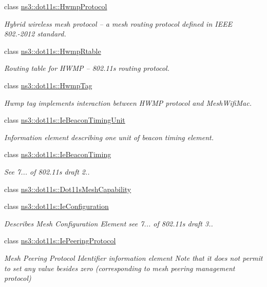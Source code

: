 \begin{DoxyCompactItemize}
class \hyperlink{classns3_1_1dot11s_1_1HwmpProtocol}{ns3\+::dot11s\+::\+Hwmp\+Protocol}
\begin{DoxyCompactList}\small\item\em Hybrid wireless mesh protocol -- a mesh routing protocol defined in I\+E\+EE 802.-\/2012 standard. \end{DoxyCompactList}\item 
class \hyperlink{classns3_1_1dot11s_1_1HwmpRtable}{ns3\+::dot11s\+::\+Hwmp\+Rtable}
\begin{DoxyCompactList}\small\item\em Routing table for H\+W\+MP -- 802.\+11s routing protocol. \end{DoxyCompactList}\item 
class \hyperlink{classns3_1_1dot11s_1_1HwmpTag}{ns3\+::dot11s\+::\+Hwmp\+Tag}
\begin{DoxyCompactList}\small\item\em Hwmp tag implements interaction between H\+W\+MP protocol and Mesh\+Wifi\+Mac. \end{DoxyCompactList}\item 
class \hyperlink{classns3_1_1dot11s_1_1IeBeaconTimingUnit}{ns3\+::dot11s\+::\+Ie\+Beacon\+Timing\+Unit}
\begin{DoxyCompactList}\small\item\em Information element describing one unit of beacon timing element. \end{DoxyCompactList}\item 
class \hyperlink{classns3_1_1dot11s_1_1IeBeaconTiming}{ns3\+::dot11s\+::\+Ie\+Beacon\+Timing}
\begin{DoxyCompactList}\small\item\em See 7... of 802.\+11s draft 2.. \end{DoxyCompactList}\item 
class \hyperlink{classns3_1_1dot11s_1_1Dot11sMeshCapability}{ns3\+::dot11s\+::\+Dot11s\+Mesh\+Capability}
\item 
class \hyperlink{classns3_1_1dot11s_1_1IeConfiguration}{ns3\+::dot11s\+::\+Ie\+Configuration}
\begin{DoxyCompactList}\small\item\em Describes Mesh Configuration Element see 7... of 802.\+11s draft 3.. \end{DoxyCompactList}\item 
class \hyperlink{classns3_1_1dot11s_1_1IePeeringProtocol}{ns3\+::dot11s\+::\+Ie\+Peering\+Protocol}
\begin{DoxyCompactList}\small\item\em Mesh Peering Protocol Identifier information element Note that it does not permit to set any value besides zero (corresponding to mesh peering management protocol) \end{DoxyCompactList}\item 

\end{DoxyCompactItemize}
